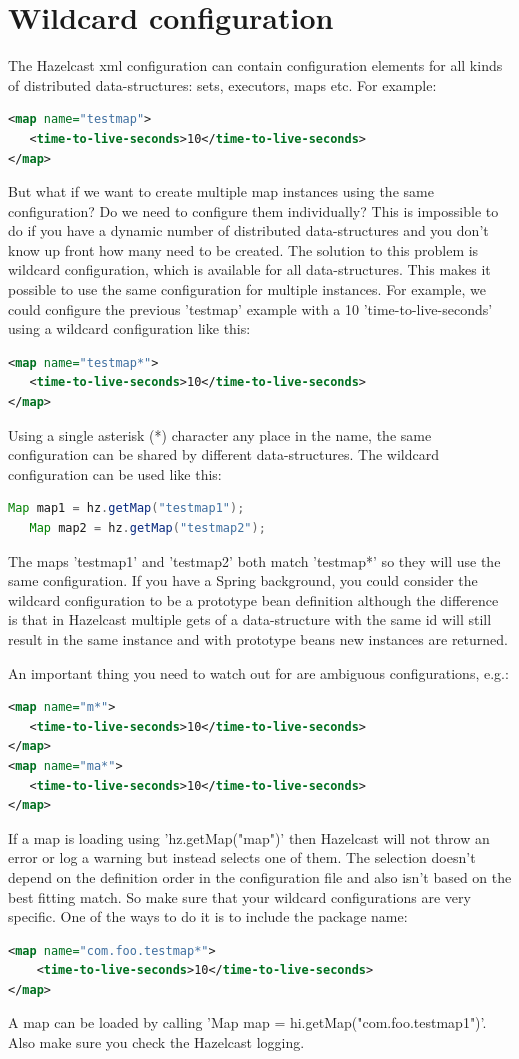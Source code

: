 \section{Wildcard configuration}
The Hazelcast xml configuration can contain configuration elements for all kinds of distributed data-structures: sets, executors, maps etc. For example:
\begin{lstlisting}[language=xml]
<map name="testmap">
   <time-to-live-seconds>10</time-to-live-seconds>
</map>
\end{lstlisting}
But what if we want to create multiple map instances using the same configuration? Do we need to configure them individually? This is impossible to do if you have a dynamic number of distributed data-structures and you don't know up front how many need to be created. The solution to this problem is wildcard configuration, which is available for all data-structures. This makes it possible to use the same configuration for multiple instances. For example, we could configure the previous 'testmap' example with a 10 'time-to-live-seconds' using a wildcard configuration like this:
\begin{lstlisting}[language=xml]
<map name="testmap*">
   <time-to-live-seconds>10</time-to-live-seconds>
</map>
\end{lstlisting}
Using a single asterisk (*) character any place in the name, the same configuration can be shared by different  data-structures. The wildcard configuration can be used like this:
\begin{lstlisting}[language=java]
   Map map1 = hz.getMap("testmap1");
   Map map2 = hz.getMap("testmap2");
\end{lstlisting}
The maps 'testmap1' and 'testmap2' both match 'testmap*' so they will use the same configuration. If you have a Spring background, you could consider the wildcard configuration to be a prototype bean definition although the difference is that in Hazelcast multiple gets of a data-structure with the same id will still result in the same instance and with prototype beans new instances are returned.

An important thing you need to watch out for are ambiguous configurations, e.g.:
\begin{lstlisting}[language=xml]
<map name="m*">
   <time-to-live-seconds>10</time-to-live-seconds>
</map>
<map name="ma*">
   <time-to-live-seconds>10</time-to-live-seconds>
</map>
\end{lstlisting}
If a map is loading using 'hz.getMap("map")' then Hazelcast will not throw an error or log a warning but instead selects one of them. The selection doesn't depend on the definition order in the configuration file and also isn't based on the best fitting match. So make sure that your wildcard configurations are very specific. One of the ways to do it is to include the package name:
\begin{lstlisting}[language=xml]
<map name="com.foo.testmap*">
    <time-to-live-seconds>10</time-to-live-seconds>
</map>
\end{lstlisting}
A map can be loaded by calling 'Map map = hi.getMap("com.foo.testmap1")'. Also make sure you check the Hazelcast logging.

